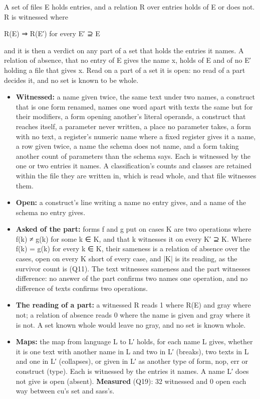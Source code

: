 A set of files E holds entries, and a relation R over entries holds of E or does not. R is witnessed where

R(E) ⇒ R(E′) for every E′ ⊇ E

and it is then a verdict on any part of a set that holds the entries it names. A relation of absence, that no entry of E gives the name x, holds of E and of no E′ holding a file that gives x. Read on a part of a set it is open: no read of a part decides it, and no set is known to be whole.

\begin{itemize}
\item \textbf{Witnessed:} a name given twice, the same text under two names, a construct that is one form renamed, names one word apart with texts the same but for their modifiers, a form opening another's literal operands, a construct that reaches itself, a parameter never written, a place no parameter takes, a form with no text, a register's numeric name where a fixed register gives it a name, a row given twice, a name the schema does not name, and a form taking another count of parameters than the schema says. Each is witnessed by the one or two entries it names. A classification's counts and classes are retained within the file they are written in, which is read whole, and that file witnesses them.
\item \textbf{Open:} a construct's line writing a name no entry gives, and a name of the schema no entry gives.
\item \textbf{Asked of the part:} forms f and g put on cases K are two operations where f(k) ≠ g(k) for some k ∈ K, and that k witnesses it on every K′ ⊇ K. Where f(k) = g(k) for every k ∈ K, their sameness is a relation of absence over the cases, open on every K short of every case, and |K| is its reading, as the survivor count is (Q11). The text witnesses sameness and the part witnesses difference: no answer of the part confirms two names one operation, and no difference of texts confirms two operations.
\item \textbf{The reading of a part:} a witnessed R reads 1 where R(E) and gray where not; a relation of absence reads 0 where the name is given and gray where it is not. A set known whole would leave no gray, and no set is known whole.
\item \textbf{Maps:} the map from language L to L′ holds, for each name L gives, whether it is one text with another name in L and two in L′ (breaks), two texts in L and one in L′ (collapses), or given in L′ as another type of form, nop, err or construct (type). Each is witnessed by the entries it names. A name L′ does not give is open (absent). \textbf{Measured} (Q19): 32 witnessed and 0 open each way between cu's set and sass's.

\end{itemize}
